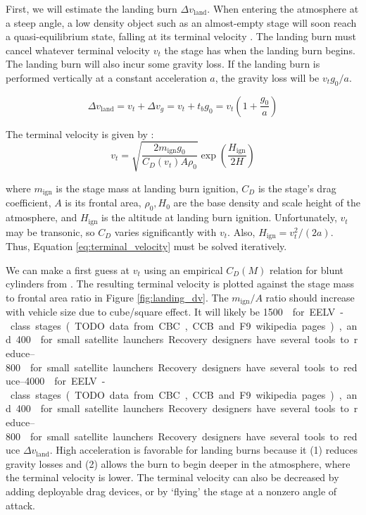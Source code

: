 \documentclass[conf]{new-aiaa}
\begin{document}
First, we will estimate the landing burn $\Delta v_{\mathrm{land}}$. When entering the atmosphere at a steep angle, a low density object such as an almost-empty stage will soon reach a quasi-equilibrium state, falling at its terminal velocity \cite{Wiesel2010}. The landing burn must cancel whatever terminal velocity $v_t$ the stage has when the landing burn begins. The landing burn will also incur some gravity loss. If the landing burn is performed vertically at a constant acceleration $a$, the gravity loss will be $v_t g_0 / a$.

\begin{equation}
\Delta v_{\mathrm{land}} = v_t + \Delta v_{g} = v_t + t_b g_0 = v_t(1 + \frac{g_0}{a})
\end{equation}

The terminal velocity is given by \cite{Wiesel2010}:
\begin{equation}
\label{eq:terminal_velocity}
v_t = \sqrt{\frac{2 m_{\mathrm{ign}} g_0}{C_D(v_t) A \rho_{0}}} \exp\left( \frac{H_\mathrm{ign}}{2H} \right)
\end{equation}

where $m_{\mathrm{ign}}$ is the stage mass at landing burn ignition, $C_D$ is the stage's drag coefficient, $A$ is its frontal area, $\rho_0, H_0$ are the base density and scale height of the atmosphere, and $H_\mathrm{ign}$ is the altitude at landing burn ignition. Unfortunately, $v_t$ may be transonic, so $C_D$ varies significantly with $v_t$. Also, $H_\mathrm{ign} = v_t^2 / (2 a)$.  Thus, Equation \ref{eq:terminal_velocity} must be solved iteratively.

We can make a first guess at $v_t$ using an empirical $C_D(M)$ relation for blunt cylinders from \cite{Hoerner1965}. The resulting terminal velocity is plotted against the stage mass to frontal area ratio in Figure \ref{fig:landing_dv}. The $m_{\mathrm{ign}}/A$ ratio should increase with vehicle size due to cube/square effect. It will likely be \SIrange{1500}{4000}{\kilogram\per\meter\square} for EELV-class stages (TODO data from CBC, CCB and F9 wikipedia pages), and \SIrange{400}{800}{\kilogram\per\meter\square} for small satellite launchers.

Recovery designers have several tools to reduce $\Delta v_{\mathrm{land}}$. High acceleration is favorable for landing burns because it (1) reduces gravity losses and (2) allows the burn to begin deeper in the atmosphere, where the terminal velocity is lower. The terminal velocity can also be decreased by adding deployable drag devices, or by `flying' the stage at a nonzero angle of attack.
\end{document}
